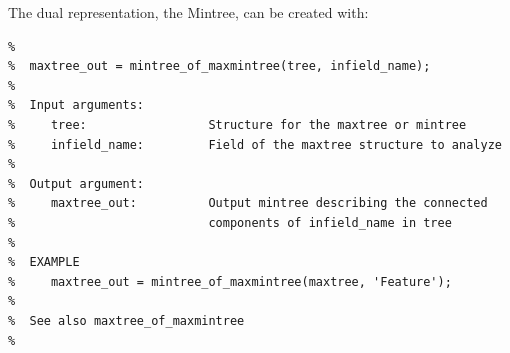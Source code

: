 \documentclass[DIV=calc, paper=a4, fontsize=11pt]{scrartcl}	 %
\begin{document}
\noindent The dual representation, the Mintree, can be created with: 
\begin{lstlisting}[aboveskip=0.5 \baselineskip]
%  mintree_of_maxmintree computes the mintree of a maxtree or a mintree.
%
%  maxtree_out = mintree_of_maxmintree(tree, infield_name);
%
%  Input arguments:
%     tree:              	Structure for the maxtree or mintree
%     infield_name:         Field of the maxtree structure to analyze
%
%  Output argument:
%     maxtree_out:          Output mintree describing the connected
%                           components of infield_name in tree
%
%  EXAMPLE
%     maxtree_out = mintree_of_maxmintree(maxtree, 'Feature');
%
%  See also maxtree_of_maxmintree
%
\end{lstlisting}

\end{document}
